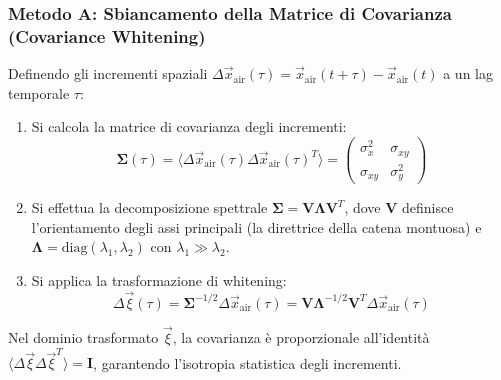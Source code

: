 \documentclass[11pt,a4paper]{article}
\begin{document}
\subsubsection{Metodo A: Sbiancamento della Matrice di Covarianza (Covariance Whitening)}
Definendo gli incrementi spaziali $\Delta \vec{x}_{\text{air}}(\tau) = \vec{x}_{\text{air}}(t+\tau) - \vec{x}_{\text{air}}(t)$ a un lag temporale $\tau$:
\begin{enumerate}
    \item Si calcola la matrice di covarianza degli incrementi:
    \begin{equation}
        \mathbf{\Sigma}(\tau) = \langle \Delta \vec{x}_{\text{air}}(\tau) \Delta \vec{x}_{\text{air}}(\tau)^T \rangle = \begin{pmatrix} \sigma_x^2 & \sigma_{xy} \\ \sigma_{xy} & \sigma_y^2 \end{pmatrix}
    \end{equation}
    \item Si effettua la decomposizione spettrale $\mathbf{\Sigma} = \mathbf{V} \mathbf{\Lambda} \mathbf{V}^T$, dove $\mathbf{V}$ definisce l'orientamento degli assi principali (la direttrice della catena montuosa) e $\mathbf{\Lambda} = \mathrm{diag}(\lambda_1, \lambda_2)$ con $\lambda_1 \gg \lambda_2$.
    \item Si applica la trasformazione di whitening:
    \begin{equation}
        \Delta \vec{\xi}(\tau) = \mathbf{\Sigma}^{-1/2} \Delta \vec{x}_{\text{air}}(\tau) = \mathbf{V} \mathbf{\Lambda}^{-1/2} \mathbf{V}^T \Delta \vec{x}_{\text{air}}(\tau)
    \end{equation}
\end{enumerate}
Nel dominio trasformato $\vec{\xi}$, la covarianza \`e proporzionale all'identit\`a $\langle \Delta \vec{\xi} \Delta \vec{\xi}^T \rangle = \mathbf{I}$, garantendo l'isotropia statistica degli incrementi.
\end{document}
